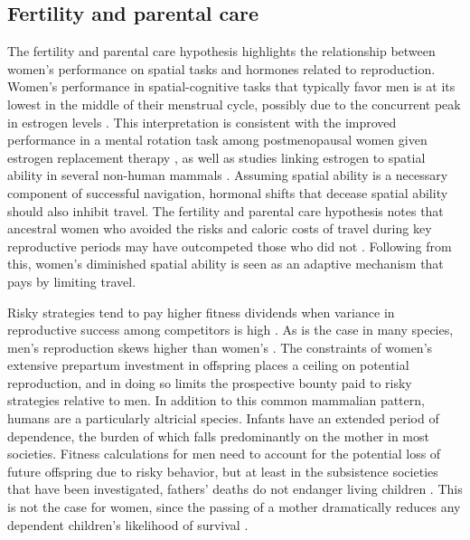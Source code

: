 	\subsection{Fertility and parental care}
	\label{sec:1.1}
The fertility and parental care hypothesis highlights the relationship between women's performance on spatial tasks and hormones related to reproduction.  Women's performance in spatial-cognitive tasks that typically favor men is at its lowest in the middle of their menstrual cycle, possibly due to the concurrent peak in estrogen levels \citep{hampson1988reciprocal, hampson1990estrogen, mccormick2001menstrual, komnenich1978gonadal, hausmann2000sex}.  This interpretation is consistent with the improved performance in a mental rotation task among postmenopausal women given estrogen replacement therapy \citep{duka2000effects}, as well as studies linking estrogen to spatial ability in several non-human mammals \citep{fugger1998sex, lacreuse1999spatial, frye1995estrus}.  Assuming spatial ability is a necessary component of successful navigation, hormonal shifts that decease spatial ability should also inhibit travel.  The fertility and parental care hypothesis notes that ancestral women who avoided the risks and caloric costs of travel during key reproductive periods may have outcompeted those who did not \citep{sherry1997evolution}.  Following from this, women's diminished spatial ability is seen as an adaptive mechanism that pays by limiting travel.
	
Risky strategies tend to pay higher fitness dividends when variance in reproductive success among competitors is high \citep{darwin1871sexual, bateman1948intra, clutton1991sexual, clutton2007sexual}.  As is the case in many species, men's reproduction skews higher than women's \citep{trivers1972parental, wilson1985competitiveness}.  The constraints of women's extensive prepartum investment in offspring places a ceiling on potential reproduction, and in doing so limits the prospective bounty paid to risky strategies relative to men.  In addition to this common mammalian pattern, humans are a particularly altricial species.  Infants have an extended period of dependence, the burden of which falls predominantly on the mother in most societies.  Fitness calculations for men need to account for the potential loss of future offspring due to risky behavior, but at least in the subsistence societies that have been investigated, fathers' deaths do not endanger living children \citep{sear2008keeps}.  This is not the case for women, since the passing of a mother dramatically reduces any dependent children's likelihood of survival \citep{hill1996ache, sear2008keeps}.  

